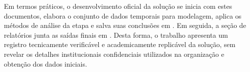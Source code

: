 Em termos pr\'aticos, o desenvolvimento oficial da solu\c{c}\~ao se inicia com estes documentos, elabora o conjunto de dados temporais para modelagem, aplica os m\'etodos de an\'alise da etapa e salva suas conclus\~oes em . Em seguida, a se\c{c}\~ao de relat\'orios junta as sa\'idas finais em . Desta forma, o trabalho apresenta um registro tecnicamente verific\'avel e academicamente replic\'avel da solu\c{c}\~ao, sem revelar os detalhes institucionais confidenciais utilizados na organiza\c{c}\~ao e obten\c{c}\~ao dos dados iniciais.
